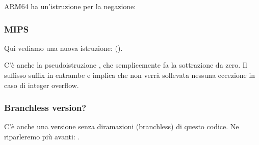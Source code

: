 ARM64 ha un'istruzione  per la negazione:



\subsubsection{MIPS}



Qui vediamo una nuova istruzione:  ().

C'è anche la pseudoistruzione  , che semplicemente fa la sottrazione da zero.
Il suffisso  suffix in entrambe  e  implica che non verrà sollevata nessuna eccezione in caso di integer overflow.

\subsubsection{Branchless version?}

C'è anche una versione senza diramazioni (branchless) di questo codice. Ne riparleremo più avanti: .
